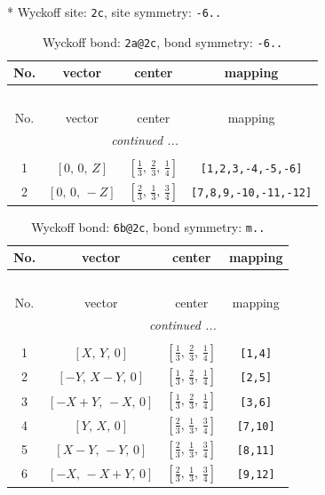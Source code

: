 \documentclass[fleqn,8pt]{jsarticle}
\begin{document}
* Wyckoff site: {\tt 2c}, site symmetry: {\tt -6..}
\renewcommand{\arraystretch}{1.2}
\begin{longtable}{cccc}
\caption{Wyckoff bond: {\tt 2a@2c}, bond symmetry: {\tt -6..}}
 \\
 \hline \hline
No. & vector & center & mapping \\ \hline \endfirsthead

\multicolumn{3}{l}{\tablename\ \thetable{}} \\
 \hline \hline
No. & vector & center & mapping \\ \hline \endhead

 \hline \hline
\multicolumn{3}{r}{\footnotesize\it continued ...} \\ \endfoot

 \hline \hline
\multicolumn{3}{r}{} \\ \endlastfoot

1 & $\left[ 0,\, 0,\, Z \right]$ & $\left[ \frac{1}{3},\, \frac{2}{3},\, \frac{1}{4} \right]$ & {\tt [1,2,3,-4,-5,-6]} \\ \hline
2 & $\left[ 0,\, 0,\, - Z \right]$ & $\left[ \frac{2}{3},\, \frac{1}{3},\, \frac{3}{4} \right]$ & {\tt [7,8,9,-10,-11,-12]} \\
\end{longtable}
\renewcommand{\arraystretch}{1.2}
\begin{longtable}{cccc}
\caption{Wyckoff bond: {\tt 6b@2c}, bond symmetry: {\tt m..}}
 \\
 \hline \hline
No. & vector & center & mapping \\ \hline \endfirsthead

\multicolumn{3}{l}{\tablename\ \thetable{}} \\
 \hline \hline
No. & vector & center & mapping \\ \hline \endhead

 \hline \hline
\multicolumn{3}{r}{\footnotesize\it continued ...} \\ \endfoot

 \hline \hline
\multicolumn{3}{r}{} \\ \endlastfoot

1 & $\left[ X,\, Y,\, 0 \right]$ & $\left[ \frac{1}{3},\, \frac{2}{3},\, \frac{1}{4} \right]$ & {\tt [1,4]} \\ \hline
2 & $\left[ - Y,\, X - Y,\, 0 \right]$ & $\left[ \frac{1}{3},\, \frac{2}{3},\, \frac{1}{4} \right]$ & {\tt [2,5]} \\ \hline
3 & $\left[ - X + Y,\, - X,\, 0 \right]$ & $\left[ \frac{1}{3},\, \frac{2}{3},\, \frac{1}{4} \right]$ & {\tt [3,6]} \\ \hline
4 & $\left[ Y,\, X,\, 0 \right]$ & $\left[ \frac{2}{3},\, \frac{1}{3},\, \frac{3}{4} \right]$ & {\tt [7,10]} \\ \hline
5 & $\left[ X - Y,\, - Y,\, 0 \right]$ & $\left[ \frac{2}{3},\, \frac{1}{3},\, \frac{3}{4} \right]$ & {\tt [8,11]} \\ \hline
6 & $\left[ - X,\, - X + Y,\, 0 \right]$ & $\left[ \frac{2}{3},\, \frac{1}{3},\, \frac{3}{4} \right]$ & {\tt [9,12]} \\
\end{longtable}
\end{document}
